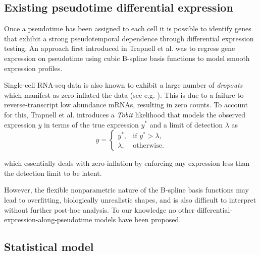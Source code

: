 \subsection{Existing pseudotime differential expression}

Once a pseudotime has been assigned to each cell it is possible to identify genes that exhibit a strong pseudotemporal dependence through differential expression testing. An approach first introduced in Trapnell et al. \cite{Trapnell2014-xi} was to regress gene expression on pseudotime using cubic B-spline basis functions to model smooth expression profiles.

Single-cell RNA-seq data is also known to exhibit a large number of \emph{dropouts} which manifest as zero-inflated the data (see e.g. \cite{Kharchenko2014}). This is due to a failure to reverse-transcript low abundance mRNAs, resulting in zero counts. To account for this, Trapnell et al. introduces a \emph{Tobit} likelihood that models the observed expression $y$ in terms of the true expression $y^*$ and a limit of detection $\lambda$ %
as
\begin{equation}
	y =
	\begin{cases}
	    y^*, & \text{if $y^* > \lambda$},  \\
	    \lambda, &  \text{otherwise}.
	\end{cases}
\end{equation}

which essentially deals with zero-inflation by enforcing any expression less than the detection limit to be latent.

However, the flexible nonparametric nature of the B-spline basis functions may lead to overfitting, biologically unrealistic shapes, and is also difficult to interpret without further post-hoc analysis. To our knowledge no other differential-expression-along-pseudotime models have been proposed.


\subsection{Statistical model}

